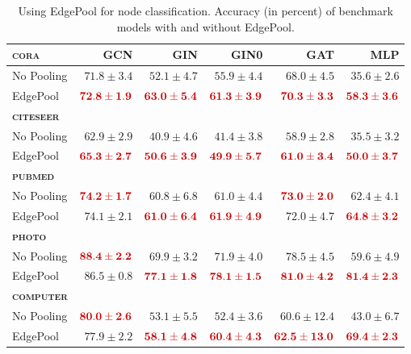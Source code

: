 \documentclass{article}
\newcommand{\edgepool}{EdgePool}
\newcommand{\datasetname}[1]{\textsc{#1}}
\newcommand{\cora}{\datasetname{cora}}
\newcommand{\citeseer}{\datasetname{citeseer}}
\newcommand{\pubmed}{\datasetname{pubmed}}
\newcommand{\photo}{\datasetname{photo}}
\newcommand{\computer}{\datasetname{computer}}
\newcommand{\best}[1]{\mathbf{\textcolor{bestcolor}{#1}}}
\begin{document}
\begin{table}
	\centering
	\caption{Using \edgepool{} for node classification. Accuracy (in percent) of benchmark models with and without \edgepool{}.} 


\begin{tabular}{lrrrrr}
	\toprule
	\textbf{\cora{}} & GCN & GIN         & GIN0 & GAT & MLP \\ \midrule
	No Pooling & $ 71.8 \pm 3.4$   & $ 52.1 \pm 4.7$ & $ 55.9 \pm 4.4$ & $68.0 \pm 4.5$ & $35.6 \pm 2.6$ \\
	\edgepool{} & $\best{72.8 \pm 1.9}$   & $ \best{63.0 \pm 5.4}$ & $\best{61.3 \pm 3.9}$      & $\best{70.3 \pm 3.3}$ & $\best{58.3 \pm 3.6}$\\
	
	\toprule
	\textbf{\citeseer{}} & &&&& \\ \midrule
	No Pooling & $ 62.9 \pm 2.9$   & $ 40.9 \pm 4.6$ & $ 41.4 \pm 3.8$ & $58.9 \pm 2.8$ & $35.5 \pm 3.2$ \\
	\edgepool{} & $\best{65.3 \pm 2.7}$   & $ \best{50.6 \pm 3.9}$ & $\best{49.9 \pm 5.7}$      & $\best{61.0 \pm 3.4}$ & $\best{50.0 \pm 3.7}$\\
	
	\toprule
	\textbf{\pubmed{}} & &&&& \\ \midrule
	No Pooling & $\best{74.2 \pm 1.7}$   & $60.8 \pm 6.8$ & $61.0 \pm 4.4$ & $\best{73.0 \pm 2.0}$ & $62.4 \pm 4.1$\\
	\edgepool{} & $74.1 \pm 2.1$   & $\best{61.0 \pm 6.4}$ & $\best{61.9 \pm 4.9}$      & $72.0 \pm 4.7$ & $\best{64.8 \pm 3.2}$\\
	
	\toprule
	\textbf{\photo{}} & &&&& \\ \midrule
	No Pooling & $\best{88.4 \pm 2.2}$   & $69.9 \pm 3.2$ & $71.9 \pm 4.0$ & $78.5 \pm 4.5$ & $59.6 \pm 4.9$\\
	\edgepool{} & $86.5 \pm 0.8$   & $\best{77.1 \pm 1.8}$ & $\best{78.1 \pm 1.5}$      & $\best{81.0 \pm 4.2}$ & $\best{81.4 \pm 2.3}$\\
	
        \toprule
	\textbf{\computer{}} & &&&& \\ \midrule
	No Pooling & $\best{80.0 \pm 2.6}$   & $53.1 \pm 5.5$ & $52.4 \pm 3.6$ & $60.6 \pm 12.4$ & $43.0 \pm 6.7$\\
	\edgepool{} & $77.9 \pm 2.2$   & $\best{58.1 \pm 4.8}$ & $\best{60.4 \pm 4.3}$      & $\best{62.5 \pm 13.0}$ & $\best{69.4 \pm 2.3}$\\

\end{tabular} 	\label{tab:results_benchmarks_node}
\end{table}
\end{document}
